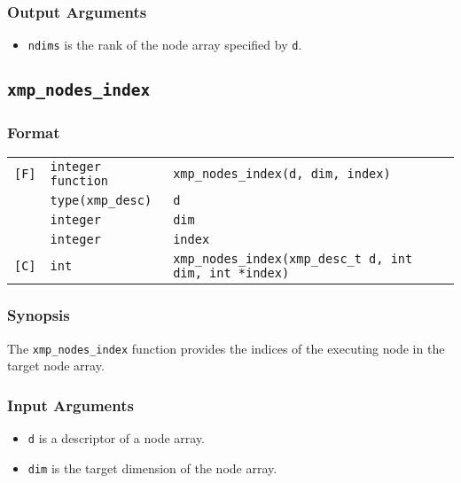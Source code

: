 \subsubsection*{Output Arguments}
\begin{itemize}
 \item {\tt ndims} is the rank of the node array specified by {\tt d}.
\end{itemize}


\subsection{\tt xmp\_nodes\_index}

\subsubsection*{Format}

\begin{tabular}{lll}

\verb![F]!& {\tt integer function}& {\tt xmp\_nodes\_index(d, dim, index)}\\
          & {\tt type(xmp\_desc)} & {\tt d}\\
          & {\tt integer} & {\tt dim}\\
          & {\tt integer} & {\tt index}\\

\verb![C]!&  {\tt int}& {\tt xmp\_nodes\_index(xmp\_desc\_t d, int dim, int *index)}\\

\end{tabular}

\subsubsection*{Synopsis}

The {\tt xmp\_nodes\_index} function provides the indices of the
executing node in the target node array.

\subsubsection*{Input Arguments}

\begin{itemize}
 \item {\tt d} is a descriptor of a node array.
 \item {\tt dim} is the target dimension of the node array.
\end{itemize}

